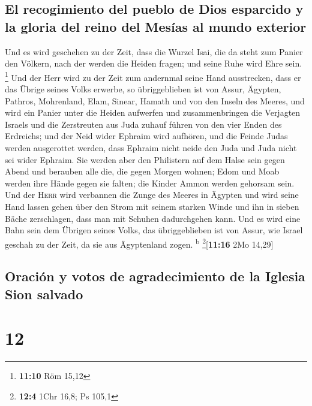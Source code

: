 \hypertarget{el-recogimiento-del-pueblo-de-dios-esparcido-y-la-gloria-del-reino-del-mesuxedas-al-mundo-exterior}{%
\subsection{El recogimiento del pueblo de Dios esparcido y la gloria del
reino del Mesías al mundo
exterior}\label{el-recogimiento-del-pueblo-de-dios-esparcido-y-la-gloria-del-reino-del-mesuxedas-al-mundo-exterior}}

 Und es wird geschehen zu der Zeit, dass die Wurzel Isai,
die da steht zum Panier den Völkern, nach der werden die Heiden fragen;
und seine Ruhe wird Ehre sein. \footnote{\textbf{11:10} Röm 15,12}
 Und der Herr wird zu der Zeit zum andernmal seine Hand
ausstrecken, dass er das Übrige seines Volks erwerbe, so übriggeblieben
ist von Assur, Ägypten, Pathros, Mohrenland, Elam, Sinear, Hamath und
von den Inseln des Meeres,  und wird ein Panier unter die
Heiden aufwerfen und zusammenbringen die Verjagten Israels und die
Zerstreuten aus Juda zuhauf führen von den vier Enden des Erdreichs;
 und der Neid wider Ephraim wird aufhören, und die Feinde
Judas werden ausgerottet werden, dass Ephraim nicht neide den Juda und
Juda nicht sei wider Ephraim.  Sie werden aber den
Philistern auf dem Halse sein gegen Abend und berauben alle die, die
gegen Morgen wohnen; Edom und Moab werden ihre Hände gegen sie falten;
die Kinder Ammon werden gehorsam sein.  Und der
\textsc{Herr} wird verbannen die Zunge des Meeres in Ägypten und wird
seine Hand lassen gehen über den Strom mit seinem starken Winde und ihn
in sieben Bäche zerschlagen, dass man mit Schuhen dadurchgehen kann.
 Und es wird eine Bahn sein dem Übrigen seines Volks, das
übriggeblieben ist von Assur, wie Israel geschah zu der Zeit, da sie aus
Ägyptenland zogen. \textsuperscript{b} \footnote{\textbf{12:4} 1Chr
  16,8; Ps 105,1}{[}\textbf{11:16} 2Mo 14,29{]}

\hypertarget{oraciuxf3n-y-votos-de-agradecimiento-de-la-iglesia-sion-salvado}{%
\subsection{Oración y votos de agradecimiento de la Iglesia Sion
salvado}\label{oraciuxf3n-y-votos-de-agradecimiento-de-la-iglesia-sion-salvado}}

\hypertarget{section-11}{%
\section{12}\label{section-11}}

